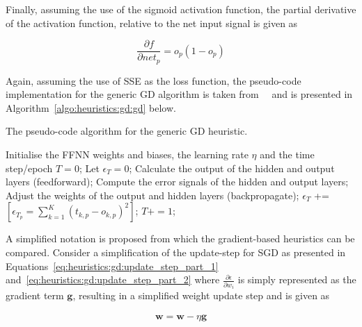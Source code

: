 Finally, assuming the use of the sigmoid activation function, the partial derivative of the activation function, relative to the net input signal is given as

\begin{equation}
      \label{eq:heuristics:gd:update_step_part_4}
      \frac{\partial f}{\partial net_{p}} = o_p(1 - o_{p})
\end{equation}

Again, assuming the use of \acs{SSE} as the loss function, the pseudo-code implementation for the generic \acs{GD} algorithm is taken from~\citeauthor{ref:engelbrecht:2007}~\cite{ref:engelbrecht:2007} and is presented in Algorithm~\ref{algo:heuristics:gd:gd} below.

\begin{algorithm}[htb]
      \caption{The pseudo-code algorithm for the generic \acf{GD} heuristic.}
      \label{algo:heuristics:gd:gd}
      \begin{algorithmic}
            \State Initialise the \acs{FFNN} weights and biases, the learning rate $\eta$ and the time step/epoch $T=0$;
            \State Let $\epsilon_{T} = 0$;
            \State Calculate the output of the hidden and output layers (feedforward);
            \State Compute the error signals of the hidden and output layers;
            \State Adjust the weights of the output and hidden layers (backpropagate);
            \State $\epsilon_{T}$ += $[\epsilon_{T_{p}} = \sum^{K}_{k=1}(t_{k,p} - o_{k,p})^{2}]$;
            \EndFor
            \State $T += 1$;
            \EndWhile
      \end{algorithmic}
\end{algorithm}

A simplified notation is proposed from which the gradient-based heuristics can be compared. Consider a simplification of the update-step for \acs{SGD} as presented in Equations~\eqref{eq:heuristics:gd:update_step_part_1} and~\eqref{eq:heuristics:gd:update_step_part_2} where $\frac{\partial \epsilon}{\partial w_{i}}$ is simply represented as the gradient term $\boldsymbol{g}$, resulting in a simplified weight update step and is given as

\begin{equation}
      \label{eq:heuristics:gd:sgd}
      \begin{split}
            \boldsymbol{w} = \boldsymbol{w} - \eta \boldsymbol{g}
      \end{split}
\end{equation}

